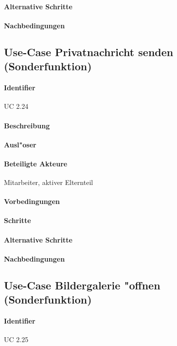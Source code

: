   \paragraph{Alternative Schritte}
  \paragraph{Nachbedingungen}
  
  \newpage
 \subsection{Use-Case Privatnachricht senden (Sonderfunktion)}
  \paragraph{Identifier}
  UC 2.24
  \paragraph{Beschreibung}
  \paragraph{Ausl"oser}
  \paragraph{Beteiligte Akteure}   \leavevmode \newline
    Mitarbeiter, aktiver Elternteil
  \paragraph{Vorbedingungen}
  \paragraph{Schritte}
  \paragraph{Alternative Schritte}
  \paragraph{Nachbedingungen}

  
  \newpage
 \subsection{Use-Case Bildergalerie "offnen (Sonderfunktion)}
  \paragraph{Identifier}
  UC 2.25
